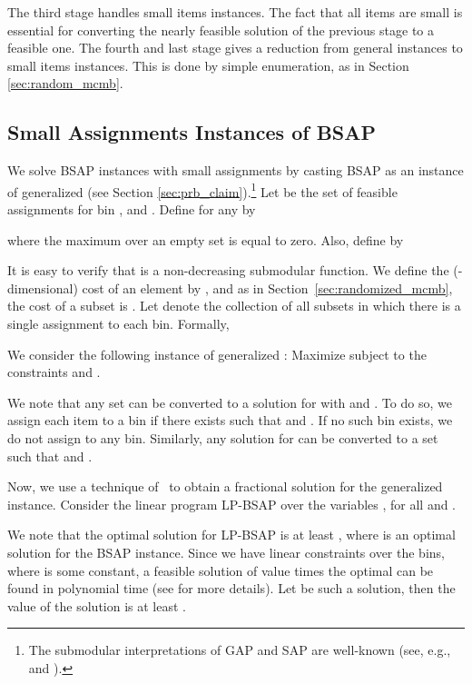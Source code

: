 \documentclass[11pt]{article}
\begin{document}
{The third stage handles small items instances. The fact that all items are small is essential for converting the nearly feasible solution of the
previous stage to a feasible one. The fourth and last stage gives a reduction from general instances to small items instances. This is done by
simple enumeration, as in Section \ref{sec:random_mcmb}.



\subsection{Small Assignments Instances of BSAP}
\label{sec:SABSAP}


We solve BSAP instances with small assignments by casting BSAP as an instance
 of generalized  (see Section \ref{sec:prb_claim}).\footnote{The submodular interpretations
of GAP and SAP are well-known (see, e.g., \cite{FV06} and \cite{fgms06}).}
 Let  be the set of feasible assignments for bin , and . Define  for any  by

where the maximum over an empty set is equal
to zero. Also, define  by 

It is easy to verify that  is a non-decreasing submodular function. We define the (-dimensional) cost of an element   by
, and as in Section~\ref{sec:randomized_mcmb}, the cost of a subset  is . Let  denote the collection of all subsets in which there is a single assignment to each bin. Formally,

We consider the following instance of generalized : Maximize  subject to the constraints  and .

We note that any set  can be converted to a solution  for  with  and . To do so, we
assign each item  to a bin  if there exists 
 such that  and . If no such bin  exists, we
do not assign  to any bin. Similarly, any solution  for
  can be converted to a set  such that  
and .

Now, we use a technique of~\cite{fgms06} to obtain a fractional solution
 for the generalized  instance. Consider the linear program
LP-BSAP over the variables , for all  and .
\begin{figure}
\begin{center}

\end{center}
\end{figure}
We note that the optimal solution for LP-BSAP is at
least , where  is an optimal solution for the BSAP
instance.
Since we have  linear constraints over the bins, where  is some constant,
a feasible solution of value  times the optimal can be found in polynomial time (see \cite{fgms06} for more details). Let  be
such a solution, then the value of the solution  is at least .

}
\end{document}
